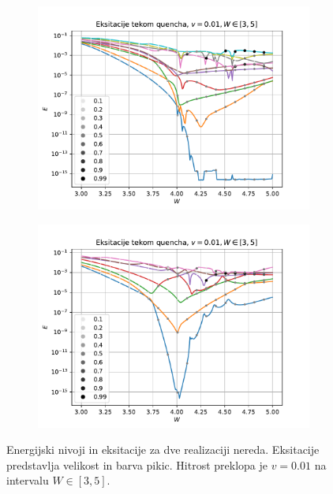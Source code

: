 \begin{figure}[H]
\centering
\begin{subfigure}{.49\textwidth}
\includegraphics[width=\linewidth]{Figures/EksTekom1.pdf}
\end{subfigure}
\begin{subfigure}{.49\textwidth}
\includegraphics[width=\linewidth]{Figures/EksTekom2.pdf}
\end{subfigure}
\caption{Energijski nivoji in eksitacije za dve realizaciji nereda. Eksitacije predstavlja velikost in barva pikic. Hitrost preklopa je $v=0.01$ na intervalu $W \in [3,5]$.}
\label{fig:EksTekom}
\end{figure}

